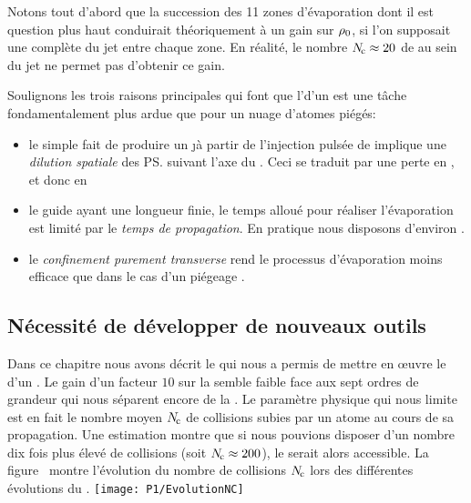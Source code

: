 Notons tout d'abord que la succession des 11 zones d'évaporation dont il est question plus haut conduirait théoriquement à un gain  sur ${\rho_{0}}$, si l'on supposait une \reth complète du jet entre chaque zone. En réalité, le nombre ${N_{\hspace{-1pt}\rm c}} \approx 20$ de \colels au sein du jet ne permet pas d'obtenir ce gain. 

\Resultat
{\label{JetAtomiqueDifficultees}
Soulignons les trois raisons principales qui font que l'\evap d'un \jat est une tâche fondamentalement plus ardue que pour un nuage d'atomes piégés:

\begin{itemize}
	\item le simple fait de produire un \j à partir de l'injection pulsée de \pats implique une \emph{dilution spatiale} des \ps suivant l'axe du \gm. Ceci se traduit par une perte en \dat, et donc en \tcolel%
	\item le guide ayant une longueur finie, le temps alloué pour réaliser l'évaporation est limité par le \emph{temps de propagation}. En pratique nous disposons d'environ .
	\item le \emph{confinement purement transverse} rend le processus d'évaporation moins efficace que dans le cas d'un piégeage \td%
	\footnotemark.
\end{itemize}
}

\subsection{Nécessité de développer de nouveaux outils}

Dans ce chapitre nous avons décrit le \setup qui nous a permis de mettre en \oe uvre le \rpef d'un \jatuf \mg. Le gain d'un facteur $10$ sur la \ddedp semble faible face aux sept ordres de grandeur qui nous séparent encore de la \condbe. Le paramètre physique qui nous limite est en fait le nombre moyen ${N_{\hspace{-1pt}\rm c}}$ de collisions subies par un atome au cours de sa propagation. Une estimation montre que si nous pouvions disposer d'un nombre dix fois plus élevé de collisions (soit ${N_{\hspace{-1pt}\rm c}}\approx200$), le \rdq serait alors accessible. La figure~ montre l'évolution du nombre de collisions ${N_{\hspace{-1pt}\rm c}}$ lors des différentes évolutions du \setup.
\bfig
\texttt{[image: P1/EvolutionNC]}
\label{fig:EvolutionNC}
\efig

